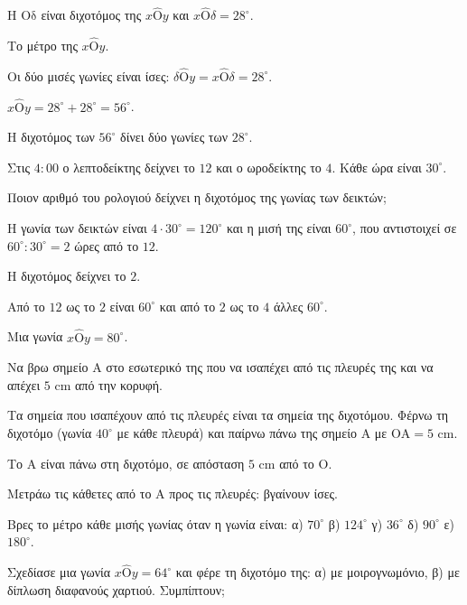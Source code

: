 \tixero Η $\mathrm{Οδ}$ είναι διχοτόμος της $x\hat{\mathrm{Ο}}y$ και $x\hat{\mathrm{Ο}}\delta=28^\circ$.\par
\tithelo Το μέτρο της $x\hat{\mathrm{Ο}}y$.\par
\possindeo Οι δύο μισές γωνίες είναι ίσες: $\delta\hat{\mathrm{Ο}}y=x\hat{\mathrm{Ο}}\delta=28^\circ$.\par
\apantisi $x\hat{\mathrm{Ο}}y=28^\circ+28^\circ=56^\circ$.\par
\elegxos Η διχοτόμος των $56^\circ$ δίνει δύο γωνίες των $28^\circ$.

\tixero Στις $4{:}00$ ο λεπτοδείκτης δείχνει το $12$ και ο ωροδείκτης το $4$. Κάθε ώρα είναι $30^\circ$.\par
\tithelo Ποιον αριθμό του ρολογιού δείχνει η διχοτόμος της γωνίας των δεικτών;\par
\possindeo Η γωνία των δεικτών είναι $4\cdot30^\circ=120^\circ$ και η μισή της είναι $60^\circ$, που αντιστοιχεί σε $60^\circ:30^\circ=2$ ώρες από το $12$.\par
\apantisi Η διχοτόμος δείχνει το $2$.\par
\elegxos Από το $12$ ως το $2$ είναι $60^\circ$ και από το $2$ ως το $4$ άλλες $60^\circ$.

\tixero Μια γωνία $x\hat{\mathrm{Ο}}y=80^\circ$.\par
\tithelo Να βρω σημείο $\mathrm{Α}$ στο εσωτερικό της που να ισαπέχει από τις πλευρές της και να απέχει $5$ cm από την κορυφή.\par
\possindeo Τα σημεία που ισαπέχουν από τις πλευρές είναι τα σημεία της διχοτόμου. Φέρνω τη διχοτόμο (γωνία $40^\circ$ με κάθε πλευρά) και παίρνω πάνω της σημείο $\mathrm{Α}$ με $\mathrm{ΟΑ}=5$ cm.\par
\apantisi Το $\mathrm{Α}$ είναι πάνω στη διχοτόμο, σε απόσταση $5$ cm από το $\mathrm{Ο}$.\par
\elegxos Μετράω τις κάθετες από το $\mathrm{Α}$ προς τις πλευρές: βγαίνουν ίσες.



\ex Βρες το μέτρο κάθε μισής γωνίας όταν η γωνία είναι: α) $70^\circ$ \quad β) $124^\circ$ \quad γ) $36^\circ$ \quad δ) $90^\circ$ \quad ε) $180^\circ$.

\ex Σχεδίασε μια γωνία $x\hat{\mathrm{Ο}}y=64^\circ$ και φέρε τη διχοτόμο της: α) με μοιρογνωμόνιο, β) με δίπλωση διαφανούς χαρτιού. Συμπίπτουν;

